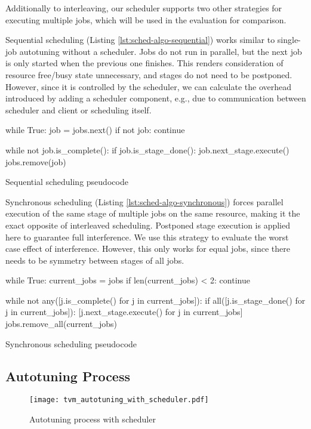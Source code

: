 Additionally to interleaving, our scheduler supports two other strategies for executing multiple jobs, which will be used in the evaluation for comparison.

Sequential scheduling (Listing \ref{lst:sched-algo-sequential}) works similar to single-job autotuning without a scheduler. Jobs do not run in parallel, but the next job is only started when the previous one finishes. This renders consideration of resource free/busy state unnecessary, and stages do not need to be postponed. However, since it is controlled by the scheduler, we can calculate the overhead introduced by adding a scheduler component, e.g., due to communication between scheduler and client or scheduling itself.

\begin{listing}[t]
\begin{pythoncode}
while True:
    job = jobs.next()
    if not job:
        continue

    while not job.is_complete():
        if job.is_stage_done():
            job.next_stage.execute()
    jobs.remove(job)
\end{pythoncode}
\unskip
\caption{Sequential scheduling pseudocode}
\label{lst:sched-algo-sequential}
\end{listing}

Synchronous scheduling (Listing \ref{lst:sched-algo-synchronous}) forces parallel execution of the same stage of multiple jobs on the same resource, making it the exact opposite of interleaved scheduling. Postponed stage execution is applied here to guarantee full interference. We use this strategy to evaluate the worst case effect of interference. However, this only works for equal jobs, since there needs to be symmetry between stages of all jobs.

\begin{listing}[t]
\begin{pythoncode}
while True:
    current_jobs = jobs
    if len(current_jobs) < 2:
        continue

    while not any([j.is_complete() for j in current_jobs]):
        if all([j.is_stage_done() for j in current_jobs]):
            [j.next_stage.execute() for j in current_jobs]
    jobs.remove_all(current_jobs)
\end{pythoncode}
\unskip
\caption{Synchronous scheduling pseudocode}
\label{lst:sched-algo-synchronous}
\end{listing}

\subsection{Autotuning Process}
\begin{figure}[ht]
	\centering
	\texttt{[image: tvm\_autotuning\_with\_scheduler.pdf]}%
	\caption{Autotuning process with scheduler}
	\label{fig:tvm-autotuning-with-scheduler}
\end{figure}

